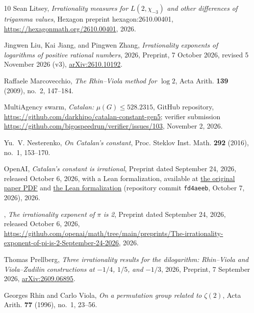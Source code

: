 \documentclass[11pt]{amsart}
\theoremstyle{definition}
\theoremstyle{remark}
\numberwithin{equation}{section}
\begin{document}
\begin{thebibliography}{10}
Sean Litsey, \emph{Irrationality measures for {$L(2,\chi_{-3})$} and other
  differences of trigamma values}, Hexagon preprint hexagon:2610.00401,
  \url{https://hexagonmath.org/2610.00401}, 2026.

Jingwen Liu, Kai Jiang, and Pingwen Zhang, \emph{Irrationality exponents of
  logarithms of positive rational numbers}, 2026, Preprint, 7 October 2026,
  revised 5 November 2026 (v3),
  \href{https://arxiv.org/abs/2610.10192}{arXiv:2610.10192}.

Raffaele Marcovecchio, \emph{The {R}hin--{V}iola method for {$\log 2$}}, Acta
  Arith. \textbf{139} (2009), no.~2, 147--184.

{MultiAgency swarm}, \emph{Catalan: {$\mu(G)\le528.2315$}}, GitHub repository,
  \url{https://github.com/darkhipo/catalan-constant-gen5}; verifier submission
  \url{https://github.com/bigospeedrun/verifier/issues/103}, November 2, 2026.

Yu.~V. Nesterenko, \emph{On {C}atalan's constant}, Proc. Steklov Inst. Math.
  \textbf{292} (2016), no.~1, 153--170.

{OpenAI}, \emph{Catalan's constant is irrational}, Preprint dated September 24,
  2026, released October 6, 2026, with a Lean formalization, available at
  \href{https://github.com/openai/math/blob/fd4aeeb2ee4fc729c18d98444fed42fd0529eeeb/preprints/Catalans-constant-is-irrational-September-24-2026/paper.pdf}{the
  original paper PDF} and
  \href{https://github.com/openai/math/tree/fd4aeeb2ee4fc729c18d98444fed42fd0529eeeb/lean/OAI/NumberTheory/Catalan}{the
  Lean formalization} (repository commit \texttt{fd4aeeb}, October 7, 2026),
  2026.

\bysame, \emph{The irrationality exponent of {$\pi$} is 2}, Preprint dated
  September 24, 2026, released October 6, 2026,
  \url{https://github.com/openai/math/tree/main/preprints/The-irrationality-exponent-of-pi-is-2-September-24-2026},
  2026.

Thomas Prellberg, \emph{Three irrationality results for the dilogarithm:
  {R}hin--{V}iola and {V}iola--{Z}udilin constructions at {$-1/4$}, {$1/5$},
  and {$-1/3$}}, 2026, Preprint, 7 September 2026,
  \href{https://arxiv.org/abs/2609.06895}{arXiv:2609.06895}.

Georges Rhin and Carlo Viola, \emph{On a permutation group related to
  {$\zeta(2)$}}, Acta Arith. \textbf{77} (1996), no.~1, 23--56.


\end{thebibliography}
\end{document}
